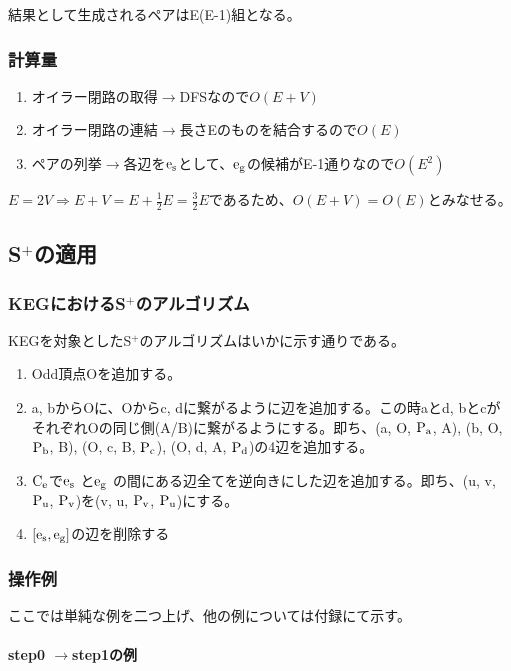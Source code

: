 \documentclass[11pt,a4j]{jarticle}
\newcommand{\splus}{S${}^\text{+}$}
\newcommand{\f}[1]{$\rm{#1}$} %
\newcommand{\ra }{$\rightarrow$}
\begin{document}
結果として生成されるペアはE(E-1)組となる。

\subsubsection{計算量}
\begin{enumerate}
    \item オイラー閉路の取得\ra DFSなので$O(E+V)$
    \item オイラー閉路の連結\ra 長さEのものを結合するので$O(E)$
    \item ペアの列挙\ra 各辺を\f{e_s}として、\f{e_g}の候補がE-1通りなので$O(E^2)$
\end{enumerate}
$E=2V \Rightarrow E+V=E+\frac{1}{2}E=\frac{3}{2}E$であるため、$O(E+V)=O(E)$とみなせる。

\subsection{\splus の適用}

\subsubsection{KEGにおける\splus のアルゴリズム}
KEGを対象とした\splus のアルゴリズムはいかに示す通りである。
\begin{enumerate}
    \item Odd頂点Oを追加する。
    \item a, bからOに、Oからc, dに繋がるように辺を追加する。この時aとd, bとcがそれぞれOの同じ側(A/B)に繋がるようにする。即ち、(a, O, \f{P_a}, A), (b, O, \f{P_b}, B), (O, c, B, \f{P_c}), (O, d, A, \f{P_d})の4辺を追加する。
    \item \f{C_e}で\f{e_s} と\f{e_g} の間にある辺全てを逆向きにした辺を追加する。即ち、(u, v, \f{P_u}, \f{P_v})を(v, u, \f{P_v}, \f{P_u})にする。
    \item $[\rm{e_s}, \rm{e_g}]$の辺を削除する
\end{enumerate}

\subsubsection{操作例}
ここでは単純な例を二つ上げ、他の例については付録にて示す。

\paragraph{step0 \ra  step1の例}
\end{document}
